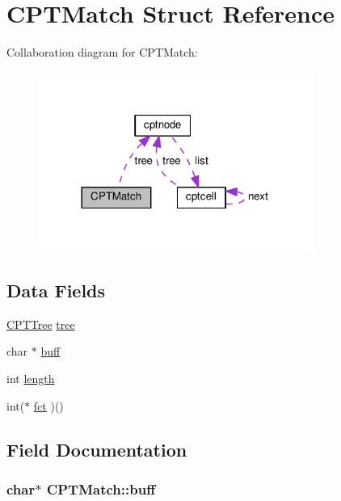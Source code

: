\hypertarget{structCPTMatch}{}\section{C\+P\+T\+Match Struct Reference}
\label{structCPTMatch}


Collaboration diagram for C\+P\+T\+Match\+:\nopagebreak
\begin{figure}[H]
\begin{center}
\leavevmode
\includegraphics[width=254pt]{structCPTMatch__coll__graph}
\end{center}
\end{figure}
\subsection*{Data Fields}
\begin{DoxyCompactItemize}
\item 
\hyperlink{cpt__string_8c_ab66488a4813896c44d2e4bbcf8d43a86}{C\+P\+T\+Tree} \hyperlink{structCPTMatch_a11fa53acc2fd955cbea152f381e82f31}{tree}
\item 
char $\ast$ \hyperlink{structCPTMatch_a07b32173eb67b2c3e2918bf5a8d29ee5}{buff}
\item 
int \hyperlink{structCPTMatch_aa6d88b8078ed95b080fd648bd46a67c9}{length}
\item 
int($\ast$ \hyperlink{structCPTMatch_a1bee4a76898a1ef5809eb26af9d9673d}{fct} )()
\end{DoxyCompactItemize}


\subsection{Field Documentation}
\subsubsection[{\texorpdfstring{buff}{buff}}]{\setlength{\rightskip}{0pt plus 5cm}char$\ast$ C\+P\+T\+Match\+::buff}\hypertarget{structCPTMatch_a07b32173eb67b2c3e2918bf5a8d29ee5}{}\label{structCPTMatch_a07b32173eb67b2c3e2918bf5a8d29ee5}
